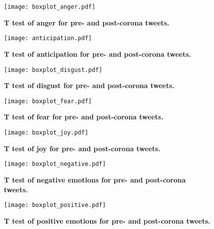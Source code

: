 \documentclass[12pt]{article}
\begin{document}
\begin{figure}[H]
\caption{\textbf{T test of anger for pre- and post-corona tweets.}}
\texttt{[image: boxplot\_anger.pdf]}

\end{figure}

\begin{figure}[H]
\caption{\textbf{T test of anticipation for pre- and post-corona tweets.}}
\texttt{[image: anticipation.pdf]}

\end{figure}

\begin{figure}[H]
\caption{\textbf{T test of disgust for pre- and post-corona tweets.}}
\texttt{[image: boxplot\_disgust.pdf]}

\end{figure}

\begin{figure}[H]
\caption{\textbf{T test of fear for pre- and post-corona tweets.}}
\texttt{[image: boxplot\_fear.pdf]}

\end{figure}

\begin{figure}[H]
\caption{\textbf{T test of joy for pre- and post-corona tweets.}}
\texttt{[image: boxplot\_joy.pdf]}

\end{figure}

\begin{figure}[H]
\caption{\textbf{T test of negative emotions for pre- and post-corona tweets.}}
\texttt{[image: boxplot\_negative.pdf]}

\end{figure}

\begin{figure}[H]
\caption{\textbf{T test of positive emotions for pre- and post-corona tweets.}}
\texttt{[image: boxplot\_positive.pdf]}

\end{figure}
\end{document}
